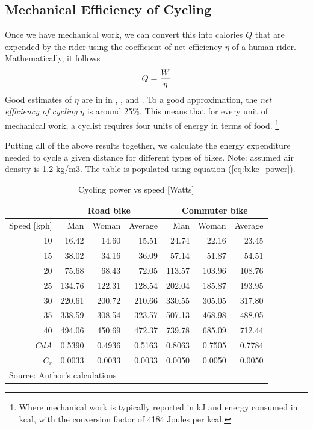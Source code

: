 \documentclass{article}[12pt,letterpaper]
\begin{document}
\subsection{Mechanical Efficiency of Cycling}
Once we have mechanical work, we can convert this into calories $Q$ that are expended by the rider using the coefficient of net efficiency $\eta$ of a human rider.
Mathematically, it follows
\begin{equation}
  Q = {W \over \eta}
\end{equation}
Good estimates of $\eta$ are in in \citet{delta-cyc-1}, \citet{cycling-efficiency-review}, \citet{efficiency-young-old} and \citet{lance-2005}. To a good approximation, the {\em net efficiency of cycling} $\eta$ is around 25\%. This means that for every unit of mechanical work, a cyclist requires four units of energy in terms of food. \footnote{Where mechanical work is typically reported in kJ and energy consumed in kcal, with the conversion factor of 4184 Joules per kcal.}

Putting all of the above results together, we calculate the energy expenditure needed to cycle a given distance for different types of bikes. Note: assumed air density is 1.2 kg/m3. The table is populated using equation (\ref{eq:bike_power}).
\begin{table}[ht]
\begin{center}
\caption{Cycling power vs speed [Watts]}
\label{tab:bike-power-vs-speed}
\begin{tabular}{|r|r|r|r|r|r|r|}
\hline
& \multicolumn{3}{|c|}{Road bike} & \multicolumn{3}{|c|}{Commuter bike} \\
\hline
Speed [kph] & Man & Woman & Average & Man & Woman & Average \\
\hline
10 & 16.42 &	14.60 &	15.51 &	24.74 &	22.16 &	23.45 \\
15 & 38.02 &	34.16 &	36.09 &	57.14 &	51.87&	54.51 \\
20 & 75.68 &	68.43 &	72.05 &	113.57 & 103.96 & 108.76 \\
25 & 134.76 &	122.31 & 128.54 & 202.04 & 185.87 & 193.95 \\
30 & 220.61 &	200.72 & 210.66	& 330.55 & 305.05 & 317.80 \\
35 & 338.59 &	308.54 & 323.57	& 507.13 & 468.98 & 488.05 \\
40& 494.06 &	450.69 & 472.37	& 739.78 & 685.09 & 712.44 \\
\hline
$CdA$ & 0.5390 & 0.4936 & 0.5163 & 0.8063 & 0.7505 & 0.7784\\
$C_r$ & 0.0033 & 0.0033	& 0.0033 & 0.0050 & 0.0050 & 0.0050\\
\hline
\multicolumn{7}{l}{Source: Author's calculations}\\
\end{tabular}
\end{center}
\end{table}
\end{document}
